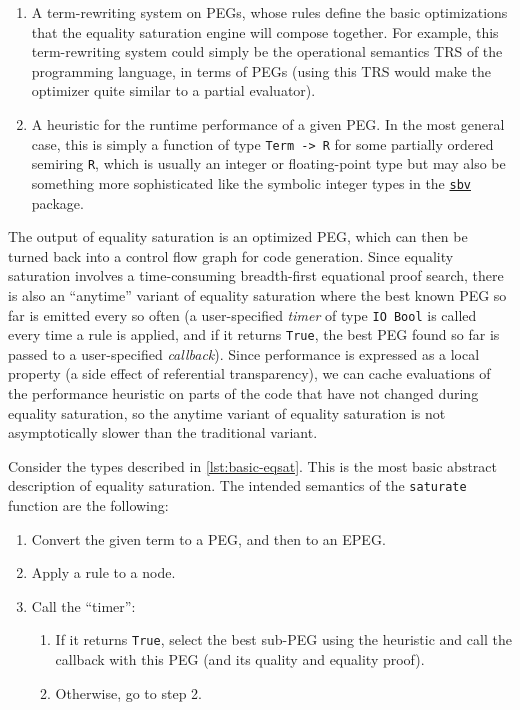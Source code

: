 \documentclass[11pt]{report}
\newcommand{\haskell}[1]{\texttt{#1}}
\begin{document}

\begin{enumerate}
\item {%
  A term-rewriting system on PEGs, whose rules define the basic optimizations
  that the equality saturation engine will compose together. For example, this
  term-rewriting system could simply be the operational semantics TRS of the
  programming language, in terms of PEGs (using this TRS would make the
  optimizer quite similar to a partial evaluator).
}
\item {%
  A heuristic for the runtime performance of a given PEG.
  In the most general case, this is simply a function of type
  \haskell{Term -> R} for some partially ordered semiring \haskell{R},
  which is usually an integer or floating-point type but may also be something
  more sophisticated like the symbolic integer types in the
  \href{https://hackage.haskell.org/package/sbv}{\texttt{sbv}} package.
}
\end{enumerate}

The output of equality saturation is an optimized PEG, which can then be turned
back into a control flow graph for code generation. Since equality saturation
involves a time-consuming breadth-first equational proof search, there is also
an ``anytime'' variant of equality saturation where the best known PEG so far
is emitted every so often (a user-specified \textit{timer} of type
\haskell{IO Bool} is called every time a rule is applied, and if it returns
\haskell{True}, the best PEG found so far is passed to a user-specified
\textit{callback}). Since performance is expressed as a local property (a side
effect of referential transparency), we can cache evaluations of the performance
heuristic on parts of the code that have not changed during equality saturation,
so the anytime variant of equality saturation is not asymptotically slower than
the traditional variant.

Consider the types described in \autoref{lst:basic-eqsat}. This is the most
basic abstract description of equality saturation. The intended semantics of the
\texttt{saturate} function are the following:

\begin{enumerate}
\item Convert the given term to a PEG, and then to an EPEG.
\item Apply a rule to a node.
\item {%
  Call the ``timer'':
  \begin{enumerate}
  \item {%
    If it returns \texttt{True}, select the best sub-PEG using the heuristic and
    call the callback with this PEG (and its quality and equality proof).
  }
  \item {%
    Otherwise, go to step 2.
  }
  \end{enumerate}
}
\end{enumerate}
\end{document}
